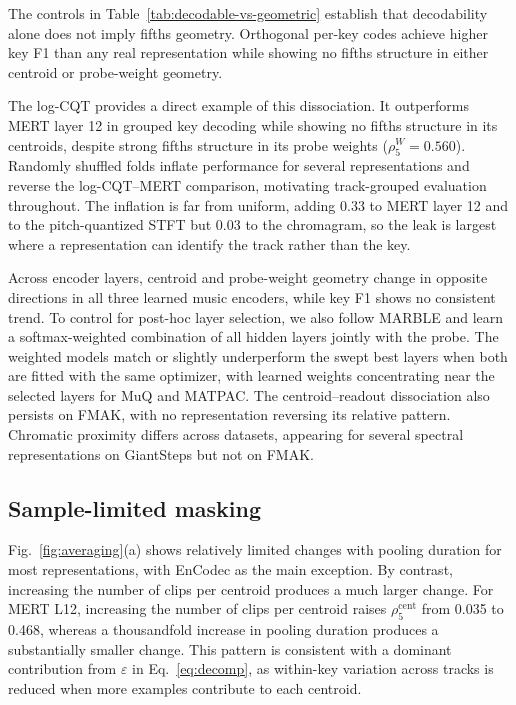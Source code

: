 \documentclass{article}
\begin{document}
\label{sec:three}
The controls in Table~\ref{tab:decodable-vs-geometric} establish that decodability alone does not imply fifths geometry. Orthogonal per-key codes achieve higher key F1 than any real representation while showing no fifths structure in either centroid or probe-weight geometry.

The log-CQT provides a direct example of this dissociation. It outperforms MERT layer 12 in grouped key decoding while showing no fifths structure in its centroids, despite strong fifths structure in its probe weights ($\rho^W_5=0.560$). Randomly shuffled folds inflate performance for several representations and
reverse the log-CQT--MERT comparison, motivating track-grouped evaluation
throughout. The inflation is far from uniform, adding 0.33 to MERT layer 12 and
to the pitch-quantized STFT but 0.03 to the chromagram, so the leak is largest
where a representation can identify the track rather than the key.

Across encoder layers, centroid and probe-weight geometry change in opposite directions in all three learned music encoders, while key F1 shows no consistent trend. To control for post-hoc layer selection, we also follow MARBLE and learn a softmax-weighted combination of all hidden layers jointly with the probe. The weighted models match or slightly underperform the swept best layers when both are fitted with the same optimizer, with learned weights concentrating near the selected layers for MuQ and MATPAC. The centroid–readout dissociation also persists on FMAK, with no representation reversing its relative pattern. Chromatic proximity differs across datasets, appearing for several spectral representations on GiantSteps but not on FMAK.

\subsection{Sample-limited masking}
\label{sec:sample}

Fig.~\ref{fig:averaging}(a) shows relatively limited changes with pooling duration for most representations, with EnCodec as the main exception.
By contrast, increasing the number of clips per centroid produces a much larger change. For MERT L12, increasing the number of clips per centroid raises $\rho^{\mathrm{cent}}_5$ from 0.035 to 0.468, whereas a thousandfold increase in pooling duration produces a substantially smaller change. This pattern is consistent with a dominant contribution from $\varepsilon$ in Eq.~\eqref{eq:decomp}, as within-key variation across tracks is reduced when more examples contribute to each centroid.
\end{document}
